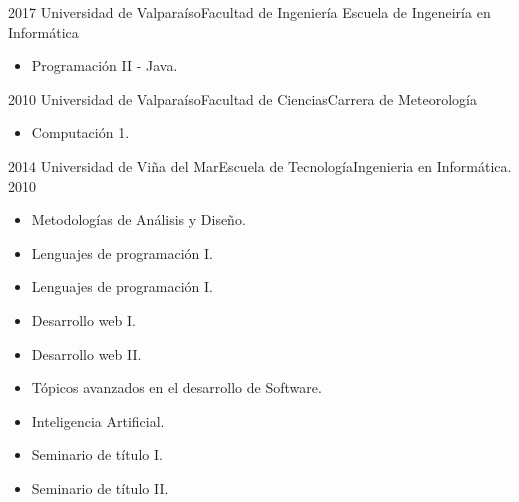 %
%
%
\begin{experiences}
  \experience
    {2017} {Universidad de Valpara\'iso}{Facultad de Ingenier\'ia}{ Escuela de Ingeneir\'ia en Inform\'atica}
    {} {
                      \begin{itemize}
                        \item Programaci\'on II - Java.
                      \end{itemize}
                    }
                    {}
  \emptySeparator

  \experience
    {2010} {Universidad de Valpara\'iso}{Facultad de Ciencias}{Carrera de Meteorolog\'ia}
    {} {
                      \begin{itemize}
                        \item Computaci\'on 1.
                      \end{itemize}
                    }
                    {}
  \emptySeparator
  \experience
    {2014} {Universidad de Viña del Mar}{Escuela de Tecnolog\'ia}{Ingenieria en Inform\'atica.}
    {2010}    {
                      \begin{itemize}
                        \item Metodolog\'ias de An\'alisis y Diseño.
                        \item Lenguajes de programación I.
                        \item Lenguajes de programación I.
                        \item Desarrollo web I.
                        \item Desarrollo web II.
                        \item Tópicos avanzados en el desarrollo de Software.
                        \item Inteligencia Artificial.
                        \item Seminario de título I.
                        \item Seminario de título II.
                      \end{itemize}
                    }
                    {}


\end{experiences}
